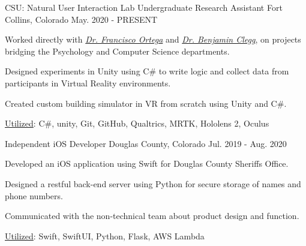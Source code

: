 

\begin{cventries}

  \cventry
    {CSU: Natural User Interaction Lab} %
    {Undergraduate Research Assistant} %
    {Fort Collins, Colorado} %
    {May. 2020 - PRESENT} %
    {
      \begin{cvitems} %
        \item {Worked directly with \textit{\href{https://compsci.colostate.edu/person/?id=22550A7530193FD205613DD09DD2EE6F&sq=t}{Dr. Francisco Ortega}} and \textit{\href{http://psywebserv.psych.colostate.edu/psylist/detail.asp?Num=15}{Dr. Benjamin Clegg}}, on projects bridging the Psychology and Computer Science departments.}
        \item {Designed experiments in Unity using C\# to write logic and collect data from participants  in Virtual Reality environments.}
        \item {Created custom building simulator in VR from scratch using Unity and C\#.}
        \item {\underline{Utilized}:  C\#, unity,  Git,  GitHub,  Qualtrics, MRTK, Hololens 2, Oculus}
      \end{cvitems}
    }

  \cventry
    {Independent} %
    {iOS Developer} %
    {Douglas County, Colorado} %
    {Jul. 2019 - Aug. 2020} %
    {
      \begin{cvitems} %
        \item {Developed an iOS  application using Swift for Douglas County Sheriffs Office.}
        \item {Designed a restful  back-end server using Python for secure storage of names and phone numbers.}
        \item {Communicated with the non-technical team about product design and function.}
        \item {\underline{Utilized}:  Swift, SwiftUI,  Python, Flask, AWS Lambda}
      \end{cvitems}
    }


\end{cventries}
